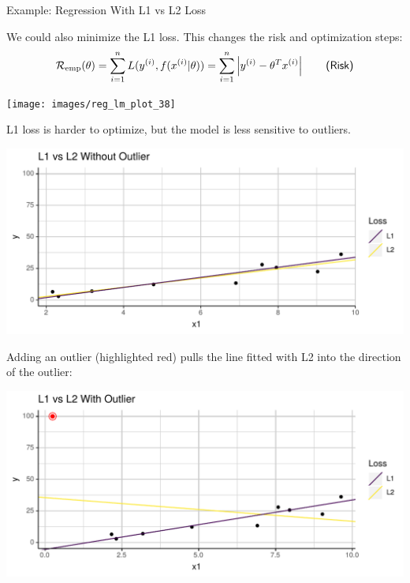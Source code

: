 \documentclass[11pt,compress,t,notes=noshow, xcolor=table]{beamer}
\newenvironment{knitrout}{}{} %
\begin{document}
\begin{vbframe}{Example: Regression With L1 vs L2 Loss}

We could also minimize the L1 loss. This changes the risk and optimization steps:
\[
\mathcal{R}_{\text{emp}}(\theta) = \sum_{i=1}^n L(y^{(i)}, f(x^{(i)} | \theta)) = \sum_{i=1}^n \left|y^{(i)} - \theta^T x^{(i)}\right| \qquad \textsf{(Risk)}
\]

\begin{knitrout}\scriptsize
{}\color{fgcolor}

{\centering \texttt{[image: images/reg\_lm\_plot\_38]}

}



\end{knitrout}

L1 loss is harder to optimize, but the model is less sensitive to outliers.

\framebreak

\lz
\lz

{\centering \includegraphics{figure_man/l2-vs-l1-1.pdf}}

\framebreak

Adding an outlier (highlighted red) pulls the line fitted with L2 into the direction of the outlier:

\lz

{\centering \includegraphics{figure_man/l2-vs-l1-2.pdf}}

\end{vbframe}
\end{document}
